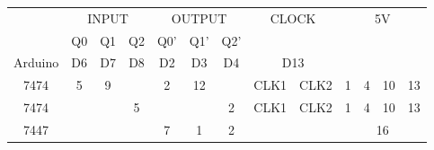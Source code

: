 \label{table:4}
\begin{tabular}{|c|c|c|c|c|c|c|c|c|c|c|c|c|}      
\hline                              
\multirow{2}{*}{} & \multicolumn{3}{|c|}{INPUT} & \multicolumn{3}{|c|}{OUTPUT} & \multicolumn{2}{|c|}{\multirow{2}{*}{CLOCK}} & \multicolumn{4}{|c|}{\multirow{3}{*}{5V}} \\      
\cline{2-7}     
& Q0 & Q1 & Q2 & Q0' & Q1' & Q2' & \multicolumn{2}{|c|}{\multirow{2}{*}{}} & \multicolumn{4}{|c|}{} \\        
\hline          
Arduino & D6 & D7 & D8 & D2 & D3 & D4 & \multicolumn{2}{|c|}{D13} & \multicolumn{4}{|c|}{\multirow{3}{*}{}}\\                                   
\hline                             
7474 & 5 & 9 &  & 2 & 12 &  & CLK1 & CLK2 & 1 & 4 & 10 & 13 \\                   
\hline                     
7474 & & & 5 & & & 2 & CLK1 & CLK2 & 1 & 4  & 10 & 13 \\                       
\hline                         
7447 & \multicolumn{3}{|c|}{} & 7 & 1 & 2 & & & \multicolumn{4}{|c|}{16} \\              
\hline                     
\end{tabular}
